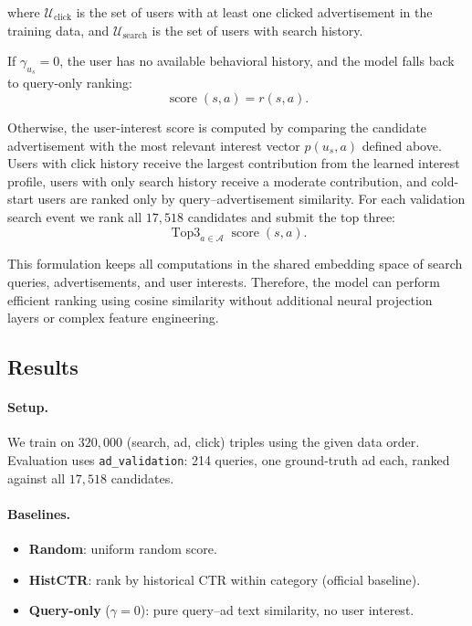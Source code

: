 \documentclass[sigconf, nonacm]{acmart}
\begin{document}
where \(\mathcal{U}_{\text{click}}\) is the set of users with at least one clicked advertisement in the training data, and \(\mathcal{U}_{\text{search}}\) is the set of users with search history. 

If \(\gamma_{u_s}=0\), the user has no available behavioral history, and the model falls back to query-only ranking:
\[
\operatorname{score}(s,a) = r(s,a).
\]

Otherwise, the user-interest score is computed by comparing the candidate advertisement with the most relevant interest vector $p(u_s,a)$ defined above.
Users with click history receive the largest contribution from the learned interest profile, users with only search history receive a moderate contribution, and cold-start users are ranked only by query--advertisement similarity.
For each validation search event we rank all $17{,}518$ candidates and submit the top three:
\[
\operatorname{Top3}_{a \in \mathcal{A}}
\operatorname{score}(s,a).
\]

This formulation keeps all computations in the shared embedding space of search queries, advertisements, and user interests. Therefore, the model can perform efficient ranking using cosine similarity without additional neural projection layers or complex feature engineering.

\subsection{Results}

\paragraph{Setup.}
We train on $320{,}000$ (search, ad, click) triples using the given data order.
Evaluation uses \texttt{ad\_validation}: 214 queries, one ground-truth
ad each, ranked against all $17{,}518$ candidates.

\paragraph{Baselines.}
\begin{itemize}
  \item \textbf{Random}: uniform random score.
  \item \textbf{HistCTR}: rank by historical CTR within category
    (official baseline).
  \item \textbf{Query-only} ($\gamma\!=\!0$): pure query--ad text
    similarity, no user interest.
\end{itemize}
\end{document}
